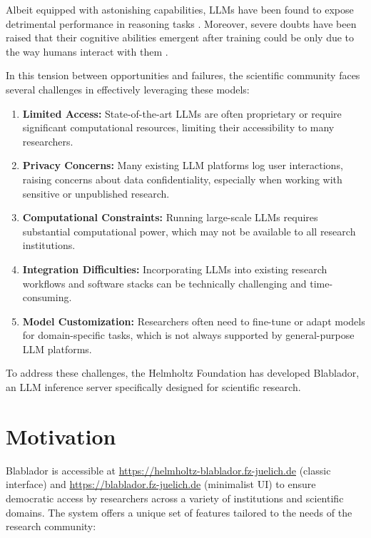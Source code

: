 \documentclass[10pt,conference]{IEEEtran}
\begin{document}
Albeit equipped with astonishing capabilities, LLMs have been found to expose detrimental performance in reasoning tasks \cite{nezhurina2024alicewonderlandsimpletasks}. Moreover, severe doubts have been raised that their cognitive abilities emergent after training could be only due to the way humans interact with them \cite{lu2024emergentabilitieslargelanguage}.

In this tension between opportunities and failures, the scientific community faces several challenges in effectively leveraging these models:

\begin{enumerate}
    \item \textbf{Limited Access:} State-of-the-art LLMs are often proprietary or require significant computational resources, limiting their accessibility to many researchers.
    
    \item \textbf{Privacy Concerns:} Many existing LLM platforms log user interactions, raising concerns about data confidentiality, especially when working with sensitive or unpublished research.
    
    \item \textbf{Computational Constraints:} Running large-scale LLMs requires substantial computational power, which may not be available to all research institutions.
    
    \item \textbf{Integration Difficulties:} Incorporating LLMs into existing research workflows and software stacks can be technically challenging and time-consuming.
    
    \item \textbf{Model Customization:} Researchers often need to fine-tune or adapt models for domain-specific tasks, which is not always supported by general-purpose LLM platforms.
\end{enumerate}

To address these challenges, the Helmholtz Foundation has developed Blablador, an LLM inference server specifically designed for scientific research. 

\section{Motivation}

Blablador is accessible at \url{https://helmholtz-blablador.fz-juelich.de} (classic interface) and \url{https://blablador.fz-juelich.de} (minimalist UI) to ensure democratic access by researchers across a variety of institutions and scientific domains. The system offers a unique set of features tailored to the needs of the research community:
\end{document}
